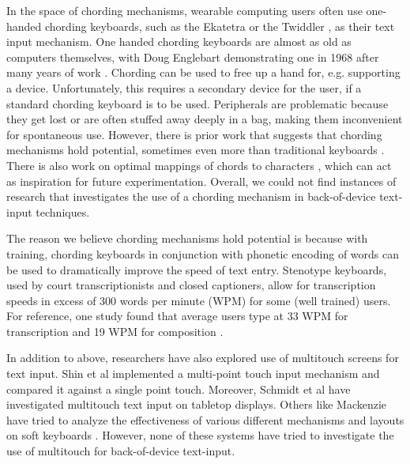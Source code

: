 In the space of chording mechanisms, wearable computing users often use one-handed chording keyboards, such as the Ekatetra \cite{Ekatetra} or the Twiddler \cite{Twiddler}, as their text input mechanism. One handed chording keyboards are almost as old as computers themselves, with Doug Englebart demonstrating one in 1968 after many years of work \cite{Englebart}. Chording can be used to free up a hand for, e.g. supporting a device.  Unfortunately, this requires a secondary device for the user, if a standard chording keyboard is to be used.  Peripherals are problematic because they get lost or are often stuffed away deeply in a bag, making them inconvenient for spontaneous use. However, there is prior work that suggests that chording mechanisms hold potential, sometimes even more than traditional keyboards \cite{Conrad}. There is also work on optimal mappings of chords to characters \cite{Gopher}, which can act as inspiration for future experimentation. Overall, we could not find instances of research that investigates the use of a chording mechanism in back-of-device text-input techniques. 

The reason we believe chording mechanisms hold potential is because with training, chording keyboards in conjunction with phonetic encoding of words can be used to dramatically improve the speed of text entry.  Stenotype keyboards, used by court transcriptionists and closed captioners, allow for transcription speeds in excess of 300 words per minute (WPM) for some (well trained) users.  For reference, one study found that average users type at 33 WPM for transcription and 19 WPM for composition \cite{Karat}. 

In addition to above, researchers have also explored use of multitouch screens for text input. Shin et al \cite{Shin} implemented a multi-point touch input mechanism and compared it against a single point touch. Moreover, Schmidt et al \cite{Schmidt} have investigated multitouch text input on tabletop displays. Others like Mackenzie have tried to analyze the effectiveness of various different mechanisms and layouts on soft keyboards \cite{Mac}. However, none of these systems have tried to investigate the use of multitouch for back-of-device text-input.
